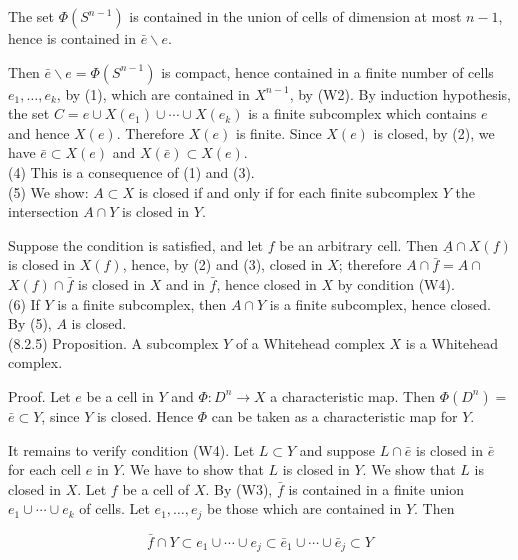 \documentclass[10pt, letterpaper]{article}
\begin{document}
The set $\Phi\left(S^{n-1}\right)$ is contained in the union of cells of dimension at most $n-1$, hence is contained in $\bar{e} \backslash e$.

Then $\bar{e} \backslash e=\Phi\left(S^{n-1}\right)$ is compact, hence contained in a finite number of cells $e_{1}, \ldots, e_{k}$, by (1), which are contained in $X^{n-1}$, by (W2). By induction hypothesis, the set $C=e \cup X\left(e_{1}\right) \cup \cdots \cup X\left(e_{k}\right)$ is a finite subcomplex which contains $e$ and hence $X(e)$. Therefore $X(e)$ is finite. Since $X(e)$ is closed, by (2), we have $\bar{e} \subset X(e)$ and $X(\bar{e}) \subset X(e)$.\\
(4) This is a consequence of (1) and (3).\\
(5) We show: $A \subset X$ is closed if and only if for each finite subcomplex $Y$ the intersection $A \cap Y$ is closed in $Y$.

Suppose the condition is satisfied, and let $f$ be an arbitrary cell. Then $\underline{A} \cap X(f)$ is closed in $X(f)$, hence, by (2) and (3), closed in $X$; therefore $A \cap \bar{f}=A \cap$ $X(f) \cap \bar{f}$ is closed in $X$ and in $\bar{f}$, hence closed in $X$ by condition (W4).\\
(6) If $Y$ is a finite subcomplex, then $A \cap Y$ is a finite subcomplex, hence closed. By (5), $A$ is closed.\\
(8.2.5) Proposition. A subcomplex $Y$ of a Whitehead complex $X$ is a Whitehead complex.

Proof. Let $e$ be a cell in $Y$ and $\Phi: D^{n} \rightarrow X$ a characteristic map. Then $\Phi\left(D^{n}\right)=$ $\bar{e} \subset Y$, since $Y$ is closed. Hence $\Phi$ can be taken as a characteristic map for $Y$.

It remains to verify condition (W4). Let $L \subset Y$ and suppose $L \cap \bar{e}$ is closed in $\bar{e}$ for each cell $e$ in $Y$. We have to show that $L$ is closed in $Y$. We show that $L$ is closed in $X$. Let $f$ be a cell of $X$. By (W3), $\bar{f}$ is contained in a finite union $e_{1} \cup \cdots \cup e_{k}$ of cells. Let $e_{1}, \ldots, e_{j}$ be those which are contained in $Y$. Then

$$
\bar{f} \cap Y \subset e_{1} \cup \cdots \cup e_{j} \subset \bar{e}_{1} \cup \cdots \cup \bar{e}_{j} \subset Y
$$
\end{document}
